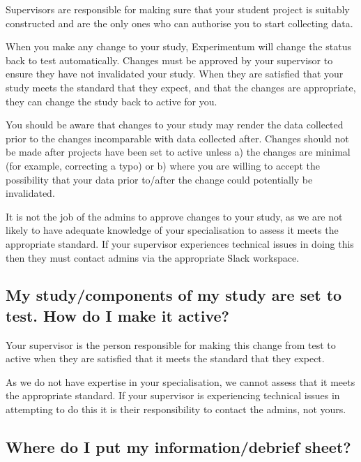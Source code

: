 \documentclass[]{book}
\begin{document}
Supervisors are responsible for making sure that your student project is
suitably constructed and are the only ones who can authorise you to
start collecting data.

When you make any change to your study, Experimentum will change the
status back to test automatically. Changes must be approved by your
supervisor to ensure they have not invalidated your study. When they are
satisfied that your study meets the standard that they expect, and that
the changes are appropriate, they can change the study back to active
for you.

You should be aware that changes to your study may render the data
collected prior to the changes incomparable with data collected after.
Changes should not be made after projects have been set to active unless
a) the changes are minimal (for example, correcting a typo) or b) where
you are willing to accept the possibility that your data prior to/after
the change could potentially be invalidated.

It is not the job of the admins to approve changes to your study, as we
are not likely to have adequate knowledge of your specialisation to
assess it meets the appropriate standard. If your supervisor experiences
technical issues in doing this then they must contact admins via the
appropriate Slack workspace.

\subsection*{My study/components of my study are set to test. How do I
make it
active?}\label{my-studycomponents-of-my-study-are-set-to-test.-how-do-i-make-it-active}

Your supervisor is the person responsible for making this change from
test to active when they are satisfied that it meets the standard that
they expect.

As we do not have expertise in your specialisation, we cannot assess
that it meets the appropriate standard. If your supervisor is
experiencing technical issues in attempting to do this it is their
responsibility to contact the admins, not yours.

\subsection*{Where do I put my information/debrief
sheet?}\label{where-do-i-put-my-informationdebrief-sheet}
\end{document}
